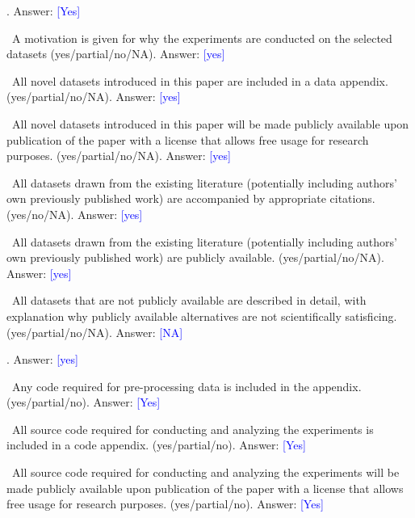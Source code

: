 \vspace{8pt}

. Answer: \textcolor{blue}{[Yes]}


\textbullet  \ A motivation is given for why the experiments are conducted on the selected datasets (yes/partial/no/NA). Answer: \textcolor{blue}{[yes]}

\textbullet  \ All novel datasets introduced in this paper are included in a data appendix. (yes/partial/no/NA). Answer: \textcolor{blue}{[yes]}

\textbullet  \ All novel datasets introduced in this paper will be made publicly available upon publication of the paper with a license that allows free usage for research purposes. (yes/partial/no/NA). Answer: \textcolor{blue}{[yes]}

\textbullet  \ All datasets drawn from the existing literature (potentially including authors’ own previously published work) are accompanied by appropriate citations. (yes/no/NA). Answer: \textcolor{blue}{[yes]}

\textbullet  \ All datasets drawn from the existing literature (potentially including authors’ own previously published work) are publicly available. (yes/partial/no/NA). Answer: \textcolor{blue}{[yes]}

\textbullet  \ All datasets that are not publicly available are described in detail, with explanation why publicly available alternatives are not scientifically satisficing. (yes/partial/no/NA). Answer: \textcolor{blue}{[NA]}

\vspace{8pt}

. Answer: \textcolor{blue}{[yes]}


\textbullet  \ Any code required for pre-processing data is included in the appendix. (yes/partial/no). Answer: \textcolor{blue}{[Yes]}

\textbullet  \ All source code required for conducting and analyzing the experiments is included in a code appendix. (yes/partial/no). Answer: \textcolor{blue}{[Yes]}

\textbullet  \ All source code required for conducting and analyzing the experiments will be made publicly available upon publication of the paper with a license that allows free usage for research purposes. (yes/partial/no). Answer: \textcolor{blue}{[Yes]}

